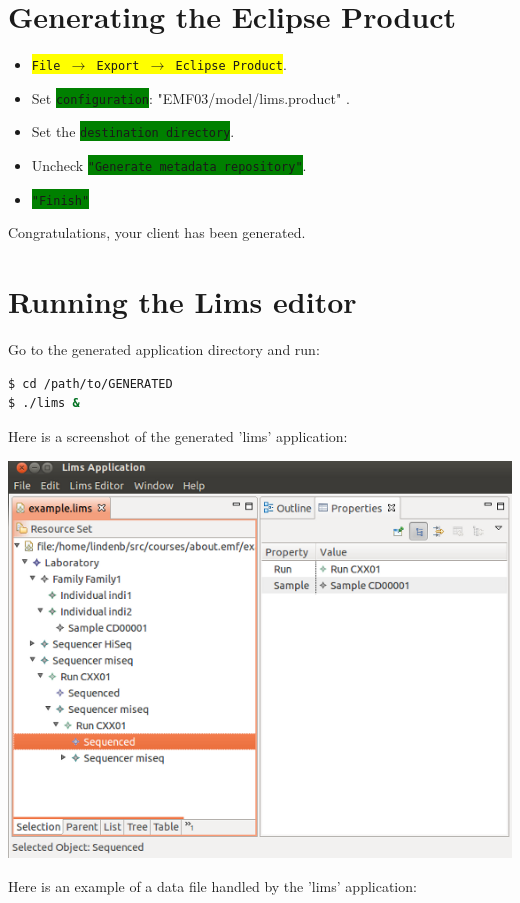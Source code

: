 \documentclass{article}
\newcommand{\menu}[1]{\colorbox{yellow}{\texttt{#1}}}
\newcommand{\wizard}[1]{\colorbox{green}{\texttt{#1}}}
\begin{document}
\section{Generating the Eclipse Product}
\begin{itemize}
\item \menu{File  $\rightarrow$ Export  $\rightarrow$ Eclipse Product}.
\item Set \wizard{configuration}: "EMF03/model/lims.product" .
\item Set the \wizard{destination directory}.
\item Uncheck \wizard{"Generate metadata repository"}.
\item \wizard{"Finish"} 
\end{itemize}
Congratulations, your client has been generated.
\section{Running the Lims editor}
Go to the generated application directory and run:
\begin{lstlisting}[language=bash]
$ cd /path/to/GENERATED
$ ./lims &
\end{lstlisting}

Here is a screenshot of the generated 'lims' application:

\begin{center}
\includegraphics[scale=0.6]{example.png}
\end{center}

Here is an example of a data file handled by the 'lims' application:

\end{document}
